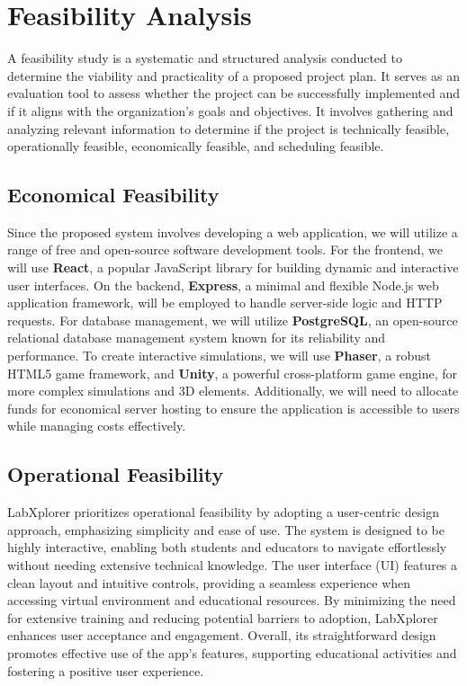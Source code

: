 \section{Feasibility Analysis}
A feasibility study is a systematic and structured analysis conducted to determine the viability and practicality of a proposed project plan. It serves as an evaluation tool to assess whether the project can be successfully implemented and if it aligns with the organization's goals and objectives. It involves gathering and analyzing relevant information to determine if the project is technically feasible, operationally feasible, economically feasible, and scheduling feasible.
\subsection{Economical Feasibility}
Since the proposed system involves developing a web application, we will utilize a range of free and open-source software development tools. For the frontend, we will use \textbf{React}, a popular JavaScript library for building dynamic and interactive user interfaces. On the backend, \textbf{Express}, a minimal and flexible Node.js web application framework, will be employed to handle server-side logic and HTTP requests. For database management, we will utilize \textbf{PostgreSQL}, an open-source relational database management system known for its reliability and performance. To create interactive simulations, we will use \textbf{Phaser}, a robust HTML5 game framework, and \textbf{Unity}, a powerful cross-platform game engine, for more complex simulations and 3D elements. Additionally, we will need to allocate funds for economical server hosting to ensure the application is accessible to users while managing costs effectively.
\subsection{Operational Feasibility}
LabXplorer prioritizes operational feasibility by adopting a user-centric design approach, emphasizing simplicity and ease of use. The system is designed to be highly interactive, enabling both students and educators to navigate effortlessly without needing extensive technical knowledge. The user interface (UI) features a clean layout and intuitive controls, providing a seamless experience when accessing virtual environment and educational resources. By minimizing the need for extensive training and reducing potential barriers to adoption, LabXplorer enhances user acceptance and engagement. Overall, its straightforward design promotes effective use of the app's features, supporting educational activities and fostering a positive user experience.
